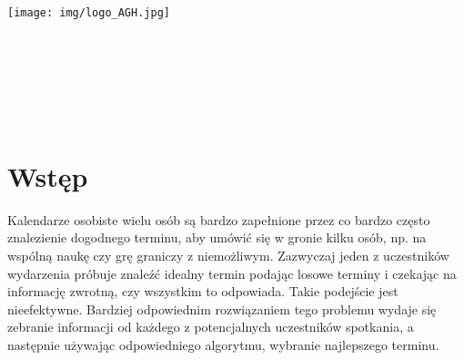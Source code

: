 \documentclass[11pt,a4paper]{article}
\begin{document}
\begin{center}
\texttt{[image: img/logo\_AGH.jpg]}\\
\bf{}\\[5mm]
\bf{}\\[14mm]
\\[12mm] 
\\[40mm]
\end{center}
\\[10mm]
\begin{center}
\end{center}

\newpage
\tableofcontents
\newpage

\section*{Wstęp}
\setcounter{section}{0}  

Kalendarze osobiste wielu osób są bardzo zapełnione przez co bardzo często znalezienie dogodnego terminu, aby umówić się w gronie kilku osób, np. na wspólną naukę czy grę graniczy z niemożliwym. Zazwyczaj jeden z uczestników wydarzenia próbuje znaleźć idealny termin podając losowe terminy i czekając na informację zwrotną, czy wszystkim to odpowiada. Takie podejście jest nieefektywne. Bardziej odpowiednim rozwiązaniem tego problemu wydaje się zebranie informacji od każdego z potencjalnych uczestników spotkania, a następnie używając odpowiedniego algorytmu, wybranie najlepszego terminu. 
\end{document}
